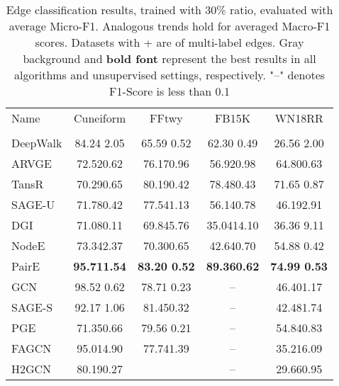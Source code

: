 \documentclass[10pt,journal,compsoc]{IEEEtran}
\begin{document}
  \begin{table*}[h]
  \begin{center}
  \caption{Edge classification results, trained with 30\% ratio, evaluated with average Micro-F1. Analogous trends hold for averaged Macro-F1 scores. Datasets with + are of multi-label edges. \colorbox{mygray}{Gray background} and \textbf{bold font} represent the best results in all algorithms and unsupervised settings, respectively. "--" denotes F1-Score is less than 0.1}
  \label{tab:edge}
\renewcommand\arraystretch{1.1}
    \begin{tabular}{p{4.5em}|c|c|c|c}
    \hline
    Name&Cuneiform&FFtwy &FB15K\- &WN18RR \\
     & & & &  \\
    \hline
    DeepWalk &84.24 2.05&65.59 0.52 & 62.30 0.49 & 26.56 2.00\\
    ARVGE& 72.520.62 & 76.170.96 & 56.920.98 & 64.800.63\\
    TansR&70.290.65 &80.190.42 &78.480.43 &71.65  0.87\\
    SAGE-U &71.780.42 &77.541.13 &56.140.78 & 46.192.91\\
    DGI&71.080.11 &69.845.76 & 35.0414.10 & 36.36 9.11 \\
    NodeE&73.342.37 &70.300.65 & 42.640.70 &54.88  0.42\\
    PairE&\textbf{95.711.54} &\colorbox{mygray}{\textbf{83.20 0.52}} &\colorbox{mygray}{\textbf{89.360.62}} & \colorbox{mygray}{\textbf{74.99  0.53}} \\
    \hline
    GCN&\colorbox{mygray}{98.52 0.62} & 78.71 0.23 & -- & 46.401.17 \\
    SAGE-S & 92.17 1.06 & 81.450.32 & -- & 42.481.74 \\
    PGE & 71.350.66 & 79.56  0.21 & -- & 54.840.83 \\
    FAGCN& 95.014.90	&77.741.39	& -- & 35.216.09 \\
    H2GCN& 80.190.27 & & -- & 29.660.95\\
    \hline
    \end{tabular}
    \end{center}
\end{table*}
\end{document}
